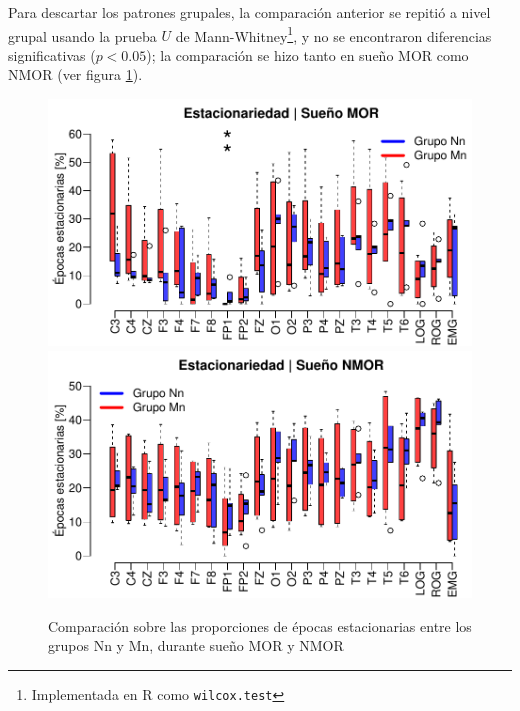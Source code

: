 Para descartar los patrones grupales,
la comparación anterior se repitió a nivel grupal usando la prueba $U$ de 
Mann-Whitney\footnote{Implementada en R como \texttt{wilcox.test}}, y no se encontraron diferencias 
significativas ($p<0.05$); la comparación se hizo tanto en sueño MOR como NMOR (ver figura 
\ref{comparacion_graf}).

\begin{figure}
\centering
\includegraphics[width=\linewidth]
{./img_ejemplos/Comparacion_gpos_MOR_v2.pdf} \\
\includegraphics[width=\linewidth]
{./img_ejemplos/Comparacion_gpos_NMOR_v2.pdf}
\caption{Comparación sobre las proporciones de épocas estacionarias entre los grupos Nn y Mn, 
durante sueño MOR y NMOR}
\label{comparacion_graf}
\end{figure}

